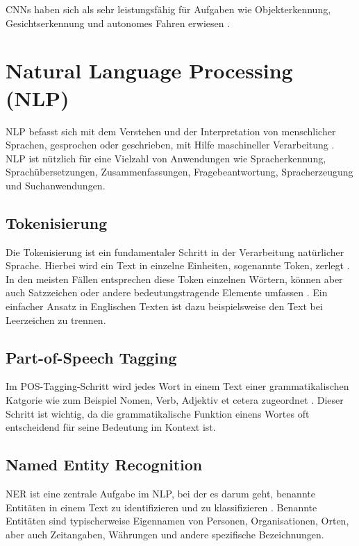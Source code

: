 CNNs haben sich als sehr leistungsfähig für Aufgaben wie Objekterkennung, Gesichtserkennung und autonomes Fahren erwiesen \cite{RebalaGopinath2019AItM}.

\section{Natural Language Processing (NLP)}
\label{sec:nlp}
\gls{NLP} befasst sich mit dem Verstehen und der Interpretation von menschlicher
Sprachen, gesprochen oder geschrieben, mit Hilfe maschineller Verarbeitung \cite{RebalaGopinath2019AItM}. \gls{NLP} ist nützlich für eine Vielzahl von
Anwendungen wie Spracherkennung, Sprachübersetzungen, Zusammenfassungen,
Fragebeantwortung, Spracherzeugung und Suchanwendungen.

\subsection{Tokenisierung}
\label{subsec:tokenisierung}
Die Tokenisierung ist ein fundamentaler Schritt in der Verarbeitung natürlicher Sprache. Hierbei wird ein Text in einzelne Einheiten, sogenannte Token, zerlegt \cite{RebalaGopinath2019AItM}. In den meisten Fällen entsprechen diese Token einzelnen Wörtern, können aber auch Satzzeichen oder andere bedeutungstragende Elemente umfassen \cite{RebalaGopinath2019AItM}. Ein einfacher Ansatz in Englischen Texten ist dazu beispielsweise den Text bei Leerzeichen zu trennen.

\subsection{Part-of-Speech Tagging}
\label{subsec:pos-tagging}
Im \gls{POS}-Tagging-Schritt wird jedes Wort in einem Text einer grammatikalischen Katgorie wie zum Beispiel Nomen, Verb, Adjektiv et cetera zugeordnet \cite{RebalaGopinath2019AItM}. Dieser Schritt ist wichtig, da die grammatikalische Funktion einens Wortes oft entscheidend für seine Bedeutung im Kontext ist.

\subsection{Named Entity Recognition}
\label{subsec:ner}
\gls{NER} ist eine zentrale Aufgabe im \gls{NLP}, bei der es darum geht, benannte Entitäten in einem Text zu identifizieren und zu klassifizieren \cite{nadeau2007survey}. Benannte Entitäten sind typischerweise Eigennamen von Personen, Organisationen, Orten, aber auch Zeitangaben, Währungen und andere spezifische Bezeichnungen.

